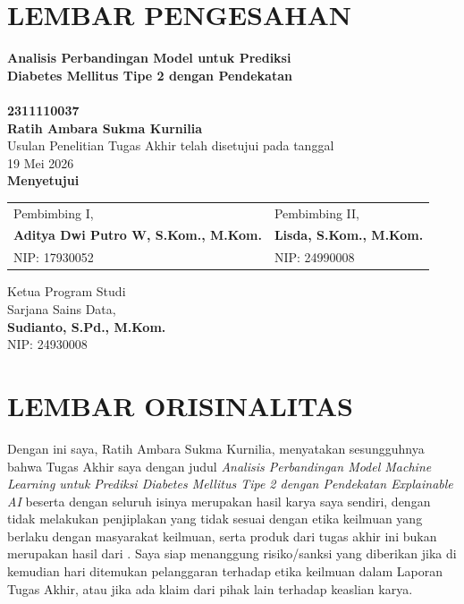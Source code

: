 \chapter*{LEMBAR PENGESAHAN}
\begin{center}
\textbf{Analisis Perbandingan Model  untuk Prediksi\\
Diabetes Mellitus Tipe 2 dengan Pendekatan }\\[0.8cm]

\\[0.8cm]

\textbf{2311110037}\\
\textbf{Ratih Ambara Sukma Kurnilia}\\[0.8cm]

Usulan Penelitian Tugas Akhir telah disetujui pada tanggal\\
19 Mei 2026\\[0.8cm]

\textbf{Menyetujui}\\[0.6cm]
\begin{tabularx}{\textwidth}{X X}
\centering Pembimbing I, & \centering\arraybackslash Pembimbing II,\\[2.2cm]
\centering \textbf{Aditya Dwi Putro W, S.Kom., M.Kom.} & \centering\arraybackslash \textbf{Lisda, S.Kom., M.Kom.}\\
\centering NIP: 17930052 & \centering\arraybackslash NIP: 24990008
\end{tabularx}

\vspace{1.2cm}
Ketua Program Studi\\
Sarjana Sains Data,\\[2.2cm]
\textbf{Sudianto, S.Pd., M.Kom.}\\
NIP: 24930008
\end{center}

\clearpage
\chapter*{LEMBAR ORISINALITAS}
Dengan ini saya, Ratih Ambara Sukma Kurnilia, menyatakan sesungguhnya bahwa Tugas Akhir saya dengan judul \textit{Analisis Perbandingan Model Machine Learning untuk Prediksi Diabetes Mellitus Tipe 2 dengan Pendekatan Explainable AI} beserta dengan seluruh isinya merupakan hasil karya saya sendiri, dengan tidak melakukan penjiplakan yang tidak sesuai dengan etika keilmuan yang berlaku dengan masyarakat keilmuan, serta produk dari tugas akhir ini bukan merupakan hasil dari . Saya siap menanggung risiko/sanksi yang diberikan jika di kemudian hari ditemukan pelanggaran terhadap etika keilmuan dalam Laporan Tugas Akhir, atau jika ada klaim dari pihak lain terhadap keaslian karya.

